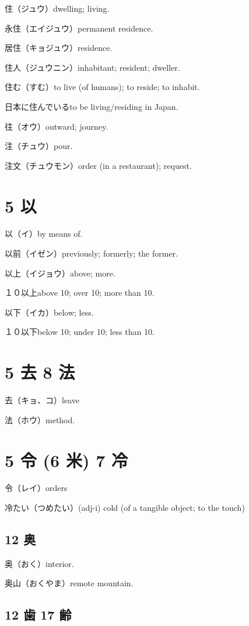 住（ジュウ）dwelling; living.

永住（エイジュウ）permanent residence.

居住（キョジュウ）residence.

住人（ジュウニン）inhabitant; resident; dweller.

住む（すむ）to live (of humans); to reside; to inhabit.

日本に住んでいるto be living/residing in Japan.

往（オウ）outward; journey.

注（チュウ）pour.

注文（チュウモン）order (in a restaurant); request.

\section{5 以}

以（イ）by means of.

以前（イゼン）previously; formerly; the former.

以上（イジョウ）above; more.

１０以上above 10; over 10; more than 10.

以下（イカ）below; less.

１０以下below 10; under 10; less than 10.

\section{5 去 8 法}

去（キョ、コ）leave

法（ホウ）method.

\section{5 令 (6 米) 7 冷}

令（レイ）orders

冷たい（つめたい）(adj-i) cold (of a tangible object; to the touch)

\subsection{12 奥}

奥（おく）interior.

奥山（おくやま）remote mountain.

\subsection{12 歯 17 齢}

